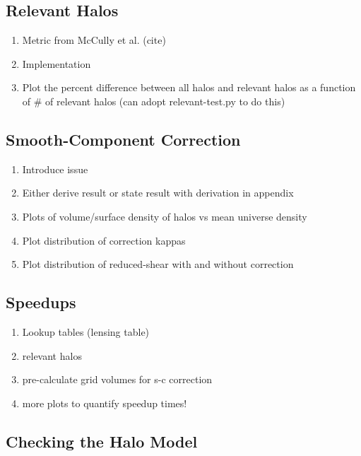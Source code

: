 \documentclass[%
 reprint,
 amsmath,amssymb,
 aps,nofootinbib
]{revtex4-1}
\begin{document}
\subsection*{Relevant Halos}
\begin{enumerate}
\item Metric from McCully et al. (cite)
\item Implementation
\item Plot the percent difference between all halos and relevant halos as a function of $\#$ of relevant halos (can adopt relevant-test.py to do this)
\end{enumerate}

\subsection*{Smooth-Component Correction}
\begin{enumerate}
\item Introduce issue
\item Either derive result or state result with derivation in appendix
\item Plots of volume/surface density of halos vs mean universe density
\item Plot distribution of correction kappas
\item Plot distribution of reduced-shear with and without correction
\end{enumerate}

\subsection*{Speedups}
\begin{enumerate}
\item Lookup tables (lensing table)
\item relevant halos
\item pre-calculate grid volumes for s-c correction
\item more plots to quantify speedup times!
\end{enumerate}

\subsection*{Checking the Halo Model}
\end{document}
